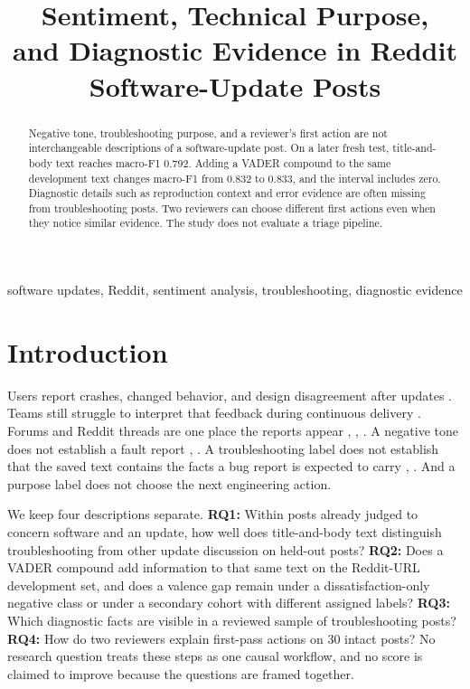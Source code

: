 \documentclass[conference,letterpaper]{IEEEtran}
\title{Sentiment, Technical Purpose,\\
and Diagnostic Evidence in Reddit Software-Update Posts}
\author{\IEEEauthorblockN{Manu Mathew Jiss and Solomon Berhe}
\IEEEauthorblockA{School of Engineering and Computer Science\\
University of the Pacific, Stockton, California, USA\\
m\_jiss@u.pacific.edu, sberhe@pacific.edu}}
\begin{document}
\maketitle
\begin{abstract}
Negative tone, troubleshooting purpose, and a reviewer's first action are not interchangeable descriptions of a software-update post. On a later fresh test, title-and-body text reaches macro-F1 0.792. Adding a VADER compound to the same development text changes macro-F1 from 0.832 to 0.833, and the interval includes zero. Diagnostic details such as reproduction context and error evidence are often missing from troubleshooting posts. Two reviewers can choose different first actions even when they notice similar evidence. The study does not evaluate a triage pipeline.
\end{abstract}
\begin{IEEEkeywords}
software updates, Reddit, sentiment analysis, troubleshooting, diagnostic evidence
\end{IEEEkeywords}

\section{Introduction}
Users report crashes, changed behavior, and design disagreement after updates \cite{Hassan2020BadUpdates}. Teams still struggle to interpret that feedback during continuous delivery \cite{Tkalich2025Feedback}. Forums and Reddit threads are one place the reports appear \cite{Iqbal2021Reddit}, \cite{Tizard2019Forums}, \cite{Singh2024ReleaseNotes}. A negative tone does not establish a fault report \cite{Jongeling2017Negative}, \cite{Lin2018HowFar}. A troubleshooting label does not establish that the saved text contains the facts a bug report is expected to carry \cite{Bettenburg2008GoodReport}, \cite{Chaparro2017Missing}. And a purpose label does not choose the next engineering action.

We keep four descriptions separate. \textbf{RQ1:} Within posts already judged to concern software and an update, how well does title-and-body text distinguish troubleshooting from other update discussion on held-out posts? \textbf{RQ2:} Does a VADER compound add information to that same text on the Reddit-URL development set, and does a valence gap remain under a dissatisfaction-only negative class or under a secondary cohort with different assigned labels? \textbf{RQ3:} Which diagnostic facts are visible in a reviewed sample of troubleshooting posts? \textbf{RQ4:} How do two reviewers explain first-pass actions on 30 intact posts? No research question treats these steps as one causal workflow, and no score is claimed to improve because the questions are framed together.
\end{document}
